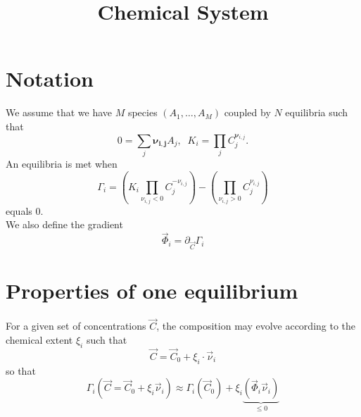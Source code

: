 \documentclass[aps]{revtex4}
\newcommand{\mymat}[1]{\boldsymbol{#1}}
\begin{document}
\title{Chemical System}
\maketitle

\section{Notation}
We assume that we have $M$ species $(A_1,\ldots,A_M)$ coupled
by $N$ equilibria such that
\begin{equation}
	0 = \sum_j \mymat{\nu_{i,j}} A_j,\;\; K_i = \prod_j C_j^{\mymat{\nu}_{i,j}}.
\end{equation}
An equilibria is met when
\begin{equation}
	\Gamma_i = \left(K_i \prod_{\nu_{i,j}<0} C_j^{-\nu_{i,j}}\right) - \left(\prod_{\nu_{i,j}>0} C_j^{\nu_{i,j}}\right)
\end{equation}
equals $0$.\\
We also define the gradient
\begin{equation}
	\vec{\Phi}_i = \partial_{\vec{C}}{\Gamma_i}
\end{equation}

\section{Properties of one equilibrium}
For a given set of concentrations $\vec{C}$, the composition may evolve according to the chemical extent $\xi_i$
such that
\begin{equation}
	\vec{C} = \vec{C}_0 + \xi_i \cdot \vec{\nu}_i
\end{equation}
so that
\begin{equation}
	\Gamma_i\left(\vec{C} = \vec{C}_0 + \xi_i  \vec{\nu}_i\right) 
	\approx
	\Gamma_i\left(\vec{C}_0\right) + \xi_i \underbrace{\left(\vec{\Phi}_i\vec{\nu}_i\right)}_{\leq 0}
\end{equation}
\end{document}
